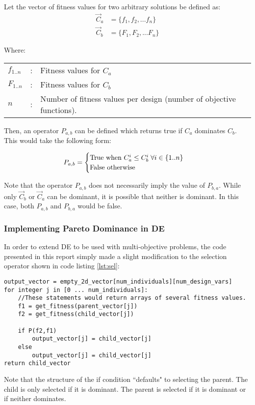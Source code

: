 Let the vector of fitness values for two arbitrary solutions be defined as:
\begin{align*}
	\vec{C}_a &= \{ f_1, f_2, ... f_n \}\\
	\vec{C}_b &= \{ F_1, F_2, ... F_n\}
\end{align*}

Where:
\begin{center}
\begin{tabular}{lcl}
	$f_{1..n}$ & : & Fitness values for $C_a$\\
	$F_{1..n}$ & : & Fitness values for $C_b$\\
	$n$ & : & Number of fitness values per design (number of objective functions). 
\end{tabular}
\end{center}

Then, an operator $P_{a,b}$ can be defined which returns true if $C_a$ dominates $C_b$. This would take the following form:

\begin{equation}
P_{a,b} = \begin{cases}
          \hbox{True  when  } C_{a}^i \le C_{b}^i \; \forall i \in \{1..n\}\\ 
          \hbox{False otherwise}
          \end{cases}
\end{equation}

Note that the operator $P_{a,b}$ does not necessarily imply the value of $P_{b,a}$. While only $\vec{C}_b$ or $\vec{C}_a$ can be dominant, it is possible that neither is dominant. In this case, both $P_{a,b}$ and $P_{b,a}$ would be false\cite{diff-evol}. 

\subsubsection{Implementing Pareto Dominance in DE}

In order to extend DE to be used with multi-objective problems, the code presented in this report simply made a slight modification to the selection operator shown in code listing \ref{lst:sel}:

\begin{lstlisting}[label=lst:modsel,caption=Modified Selection Operator,captionpos=b]
output_vector = empty_2d_vector[num_individuals][num_design_vars]
for integer j in [0 ... num_individuals]:
    //These statements would return arrays of several fitness values. 
    f1 = get_fitness(parent_vector[j])
    f2 = get_fitness(child_vector[j])

    if P(f2,f1)
        output_vector[j] = child_vector[j]
    else
        output_vector[j] = child_vector[j]
return child_vector
\end{lstlisting}
Note that the structure of the if condition ``defaults" to selecting the parent. The child is only selected if it is dominant. The parent is selected if it is dominant or if neither dominates. 

